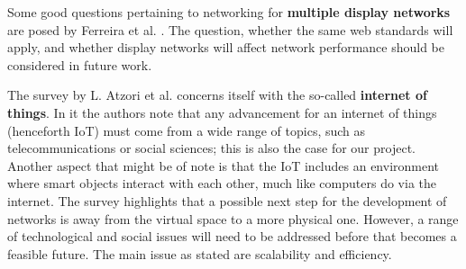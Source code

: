 Some good questions pertaining to networking for \textbf{multiple display networks} are posed by Ferreira et al. \cite{ferreira2012scalability}.
The question, whether the same web standards will apply, and whether display networks will affect network performance should be considered in future work.

The survey by L. Atzori et al. \cite{atzori2010internet} concerns itself with the so-called \textbf{internet of things}.
In it the authors note that any advancement for an internet of things (henceforth IoT) must come from a wide range of topics, such as telecommunications or social sciences; this is also the case for our project.
Another aspect that might be of note is that the IoT includes an environment where smart objects interact with each other, much like computers do via the internet.
The survey highlights that a possible next step for the development of networks is away from the virtual space to a more physical one.
However, a range of technological and social issues will need to be addressed before that becomes a feasible future.
The main issue as stated are scalability and efficiency.
